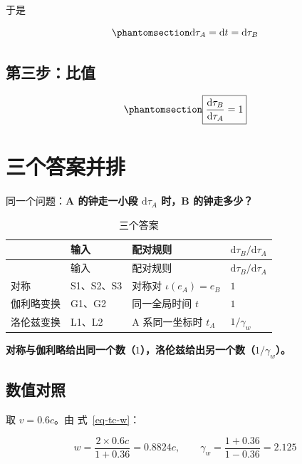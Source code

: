 \documentclass[
  chinese,
  a4paper,
  UTF8,
  12pt,
  oneside,
  openany]{ctexbook}
\theoremstyle{plain}
\theoremstyle{plain}
\theoremstyle{plain}
\theoremstyle{definition}
\theoremstyle{plain}
\theoremstyle{plain}
\theoremstyle{remark}
\begin{document}
于是

\begin{equation}\protect\phantomsection\label{eq-tc-tau-G}{
\mathrm{d}\tau_A=\mathrm{d}t=\mathrm{d}\tau_B
}\end{equation}

\subsection{第三步：比值}\label{ux7b2cux4e09ux6b65ux6bd4ux503c}

\begin{equation}\protect\phantomsection\label{eq-tc-ratio-G}{
\boxed{\dfrac{\mathrm{d}\tau_B}{\mathrm{d}\tau_A}=1}
}\end{equation}

\section{三个答案并排}\label{sec-tc-table}

同一个问题：\textbf{A 的钟走一小段 \(\mathrm{d}\tau_A\) 时，B
的钟走多少？}

\begin{longtable}[]{@{}llll@{}}
\caption{三个答案}\label{tbl-tc-ratios}\tabularnewline
\toprule\noalign{}
& 输入 & 配对规则 & \(\mathrm{d}\tau_B/\mathrm{d}\tau_A\) \\
\midrule\noalign{}
\endfirsthead
\toprule\noalign{}
& 输入 & 配对规则 & \(\mathrm{d}\tau_B/\mathrm{d}\tau_A\) \\
\midrule\noalign{}
\endhead
\bottomrule\noalign{}
\endlastfoot
对称 & S1、S2、S3 & 对称对 \(\iota(e_A)=e_B\) & \(1\) \\
伽利略变换 & G1、G2 & 同一全局时间 \(t\) & \(1\) \\
洛伦兹变换 & L1、L2 & A 系同一坐标时 \(t_A\) & \(1/\gamma_w\) \\
\end{longtable}

\textbf{对称与伽利略给出同一个数（\(1\)），洛伦兹给出另一个数（\(1/\gamma_w\)）。}

\subsection{数值对照}\label{ux6570ux503cux5bf9ux7167}

取 \(v=0.6c\)。由 式~\ref{eq-tc-w}：

\[
w=\frac{2\times0.6c}{1+0.36}=0.8824c,\qquad
\gamma_w=\frac{1+0.36}{1-0.36}=2.125
\]
\end{document}
